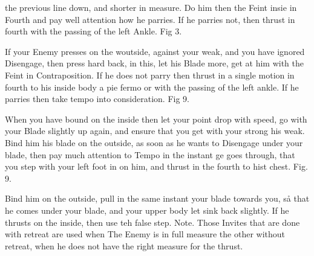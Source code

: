 \newpage


\newpage

the previous line down, and shorter in measure. Do him then the Feint insie in Fourth and pay well attention how he parries. If he parries not, then thrust in fourth with the passing of the left Ankle. Fig 3.

\exercise{}
If your Enemy presses on the woutside, against your weak, and you have ignored Disengage, then press hard back, in this, let his Blade more, get at him with the Feint in Contraposition. If he does not parry then thrust in a single motion in fourth to his inside body a pie fermo or with the passing of the left ankle. If he parries then take tempo into consideration. Fig 9.

When you have bound on the inside then let your point drop with speed,
go with your Blade slightly up again, and ensure that you get with
your strong his weak. Bind him his blade on the outside, as soon as he
wants to Disengage under your blade, then pay much attention to Tempo
in the instant ge goes through, that you step with your left foot in
on him, and thrust in the fourth to hist chest. Fig. 9.


Bind him on the outside, pull in the same instant your blade towards
you, så that he comes under your blade, and your upper body let sink
back slightly. If he thrusts on the inside, then use teh false
step. Note. Those Invites that are done with retreat are used when The
Enemy is in full measure the other without retreat, when he does not
have the right measure for the thrust.

